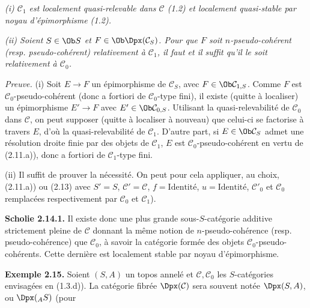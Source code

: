 \emph{(i) \(\mathcal C_1\) est localement quasi-relevable dans \(\mathcal C\) (1.2) et localement quasi-stable par noyau d'épimorphisme (1.2).}

\emph{(ii) Soient \(S\in\Ob S\) et \(F\in\Ob\Dpx(\mathcal C_S)\). Pour que \(F\) soit \(n\)-pseudo-cohérent (resp. pseudo-cohérent) relativement à \(\mathcal C_1\), il faut et il suffit qu'il le soit relativement à \(\mathcal C_0\).}

\emph{Preuve.} (i) Soit \(E\to F\) un épimorphisme de \(\mathcal C_S\), avec \(F\in\Ob\mathcal C_{1,S}\). Comme \(F\) est \(\mathcal C_0\)-pseudo-cohérent (donc a fortiori de \(\mathcal C_0\)-type fini), il existe (quitte à localiser) un épimorphisme \(E'\to F\) avec \(E'\in\Ob\mathcal C_{0,S}\). Utilisant la quasi-relevabilité de \(\mathcal C_0\) dans \(\mathcal C\), on peut supposer (quitte à localiser à nouveau) que celui-ci se factorise à travers \(E\), d'où la quasi-relevabilité de \(\mathcal C_1\). D'autre part, si \(E\in\Ob\mathcal C_S\) admet une résolution droite finie par des objets de \(\mathcal C_1\), \(E\) est \(\mathcal C_0\)-pseudo-cohérent en vertu de (2.11.a)), donc a fortiori de \(\mathcal C_1\)-type fini.

(ii) Il suffit de prouver la nécessité. On peut pour cela appliquer, au choix, (2.11.a)) ou (2.13) avec \(S'=S\), \(\mathcal C'=\mathcal C\), \(f=\text{Identité}\), \(u=\text{Identité}\), \(\mathcal C'_0\) et \(\mathcal C_0\) remplacées respectivement par \(\mathcal C_0\) et \(\mathcal C_1\)).

\textbf{Scholie 2.14.1.} Il existe donc une plus grande sous-\(S\)-catégorie additive strictement pleine de \(\mathcal C\) donnant la même notion de \(n\)-pseudo-cohérence (resp. pseudo-cohérence) que \(\mathcal C_0\), à savoir la catégorie formée des objets \(\mathcal C_0\)-pseudo-cohérents. Cette dernière est localement stable par noyau d'épimorphisme.

\textbf{Exemple 2.15.} Soient \((S,A)\) un topos annelé et \(\mathcal C,\mathcal C_0\) les \(S\)-catégories envisagées en (1.3.d)). La catégorie fibrée \(\Dpx(\mathcal C)\) sera souvent notée \(\Dpx(S,A)\), ou \(\Dpx({}_A S)\) (pour
